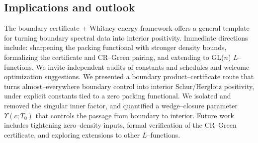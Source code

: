 \documentclass[11pt]{article}
\theoremstyle{definition}
\theoremstyle{remark}
\begin{document}
\subsection*{Implications and outlook}
The boundary certificate + Whitney energy framework offers a general template for turning boundary spectral data into interior positivity. Immediate directions include: sharpening the packing functional with stronger density bounds, formalizing the certificate and CR--Green pairing, and extending to GL($n$) $L$--functions. We invite independent audits of constants and schedules and welcome optimization suggestions.
\label{sec:concl} %
We presented a boundary product--certificate route that turns almost--everywhere boundary control into interior Schur/Herglotz positivity, 
under explicit constants tied to a zero packing functional. We isolated and removed the singular inner factor, 
and quantified a wedge--closure parameter $\Upsilon(c;T_0)$ that controls the passage from boundary to interior.
Future work includes tightening zero--density inputs, formal verification of the CR--Green certificate, and exploring extensions to other $L$--functions.
\end{document}
